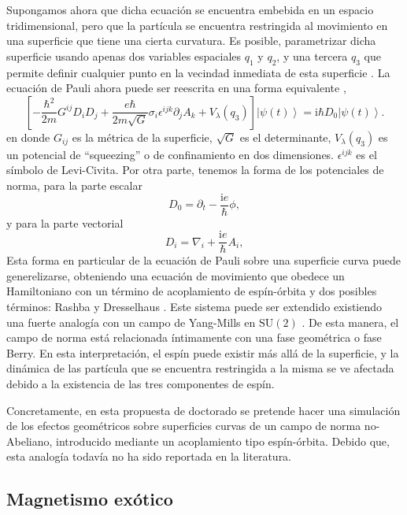 \documentclass[superscriptaddress,onecolumn,aps,preprint,showpacs,nofootinbib,pra,11pt]{revtex4-2}
\begin{document}
\begin{normalsize}
Supongamos ahora que dicha ecuación se encuentra embebida en un espacio tridimensional, pero que la partícula se encuentra restringida al movimiento en una superficie que tiene una cierta curvatura. Es posible, parametrizar dicha superficie usando apenas dos variables espaciales $ q_1$ y $q_2 $, y una tercera $q_3$ que permite definir cualquier punto en la vecindad inmediata de esta superficie \cite{Costa-pra23, Costa-pra25}. La ecuaci\'on de Pauli ahora puede ser reescrita en una forma equivalente \cite{Wang-pra90},
\begin{equation}
\left[ -\frac{\hbar^2}{2m} G^{ij}D_i D_j + \frac{e \hbar}{2m \sqrt{G}} \sigma_i  \epsilon^{ijk} \partial_j A_k+ V_{\lambda}(q_3) \right] \left|\psi \left(t \right)\right\rangle = \mathrm{i} \hbar D_0 \left|\psi \left(t \right)\right\rangle .
\end{equation}
en donde $G_{ij}$ es la métrica de la superficie, $\sqrt{G}$ es el determinante, $V_{\lambda}(q_3)$ es un potencial de ``squeezing'' o de confinamiento en dos dimensiones. $\epsilon^{ijk}$ es el símbolo de Levi-Civita. Por otra parte, tenemos la forma de los potenciales de norma, para la parte escalar
\[
D_0 = \partial_t - \frac{\mathrm{i} e}{\hbar} \phi,
\]
y para la parte vectorial
\[
D_i = \nabla_i + \frac{\mathrm{i} e}{\hbar} A_i,
\]
Esta forma en particular de la ecuación de Pauli sobre una superficie curva puede generelizarse, obteniendo una ecuación de movimiento que obedece un Hamiltoniano con un término de acoplamiento de espín-órbita y dos posibles términos: Rashba y Dresselhaus \cite{Hatano-pra75}. Este sistema puede ser extendido existiendo una fuerte analogía con un campo de Yang-Mills en $\mathrm{SU}\left(2\right)$ \cite{Cheng-prb84}. De esta manera, el campo de norma está relacionada íntimamente con una fase geométrica o fase Berry. En esta interpretación, el espín puede existir más allá de la superficie, y la dinámica de las partícula que se encuentra restringida a la misma se ve afectada debido a la existencia de las tres componentes de espín.

Concretamente, en esta propuesta de doctorado se pretende hacer una simulación de los efectos geométricos sobre superficies curvas de un campo de norma no-Abeliano, introducido mediante un acoplamiento tipo espín-órbita. Debido que, esta analogía todavía no ha sido reportada en la literatura.
 
 
\subsection{Magnetismo exótico}


\end{normalsize}
\end{document}
